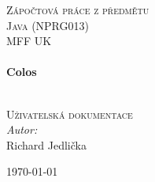 \begin{titlepage}

\begin{center}

\textsc{\normalsize
    Zápočtová práce z předmětu\\
    Java (NPRG013)\\
    MFF UK
}\\[1.5cm]


\HRule \\[0.4cm]
{\huge \bfseries Colos}

\HRule \\[1.5cm]

\textsc{\Large Uživatelská dokumentace}\\[2cm]

\emph{Autor:}\\
Richard Jedlička

\vfill

{\large \today}

\end{center}

\end{titlepage}

